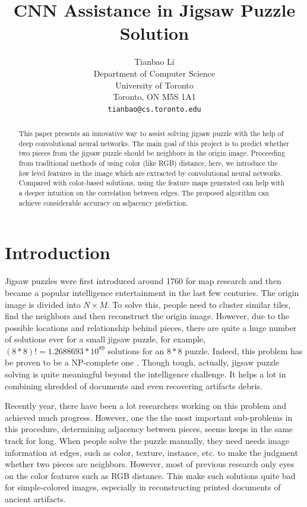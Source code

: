 \documentclass{article}
\title{CNN Assistance in Jigsaw Puzzle Solution}
\author{Tianbao Li\\
  Department of Computer Science\\
  University of Toronto\\
  Toronto, ON M5S 1A1 \\
  \texttt{tianbao@cs.toronto.edu} \\
}
\begin{document}

\maketitle

\begin{abstract}

This paper presents an innovative way to assist solving jigsaw puzzle with the help of deep convolutional neural networks. The main goal of this project is to predict whether two pieces from the jigsaw puzzle should be neighbors in the origin image. Proceeding from traditional methods of using color (like RGB) distance, here, we introduce the low level features in the image which are extracted by convolutional neural networks. Compared with color-based solutions, using the feature maps generated can help with a deeper intuition on the correlation between edges. The proposed algorithm can achieve considerable accuracy on adjacency prediction.

\end{abstract}

\section{Introduction}

Jigsaw puzzles were first introduced around 1760 for map research and then became a popular intelligence entertainment \cite{freeman1964apictorial} in the last few centuries. The origin image is divided into $N\times M$. To solve this, people need to cluster similar tiles, find the neighbors and then reconstruct the origin image. However, due to the possible locations and relationship behind pieces, there are quite a huge number of solutions ever for a small jigsaw puzzle, for example, $(8*8)!=1.2688693*10^{89}$ solutions for an $8*8$ puzzle. Indeed, this problem has be proven to be a NP-complete one \cite{altman1989solving,demaine2007jigsaw}. Though tough, actually, jigsaw puzzle solving is quite meaningful beyond the intelligence challenge. It helps a lot in combining shredded of documents \cite{levin1975computer,marques2009reconstructing} and even recovering artifacts debris\cite{koller2006computer}.

Recently year, there have been a lot researchers working on this problem and achieved much progress. However, one the the most important sub-problems in this procedure, determining adjacency between pieces, seems keeps in the same track for long. When people solve the puzzle manually, they need needs image information at edges, such as color, texture, instance, etc. to make the judgment whether two pieces are neighbors. However, most of previous research only eyes on the color features such as RGB distance. This make such solutions quite bad for simple-colored images, especially in reconstructing printed documents of ancient artifacts.
\end{document}
